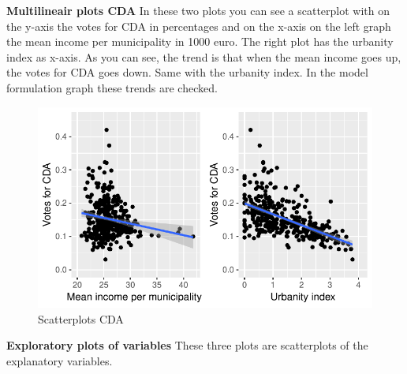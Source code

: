 \documentclass[11pt,]{article}
\begin{document}
\textbf{Multilineair plots CDA } In these two plots you can see a
scatterplot with on the y-axis the votes for CDA in percentages and on
the x-axis on the left graph the mean income per municipality in 1000
euro. The right plot has the urbanity index as x-axis. As you can see,
the trend is that when the mean income goes up, the votes for CDA goes
down. Same with the urbanity index. In the model formulation graph these
trends are checked.

\begin{figure}[H]

{\centering \includegraphics{Report_files/figure-latex/unnamed-chunk-6-1} 

}

\caption{\label{3}Scatterplots CDA}\label{fig:unnamed-chunk-6}
\end{figure}

\textbf{Exploratory plots of variables} These three plots are
scatterplots of the explanatory variables.
\end{document}

